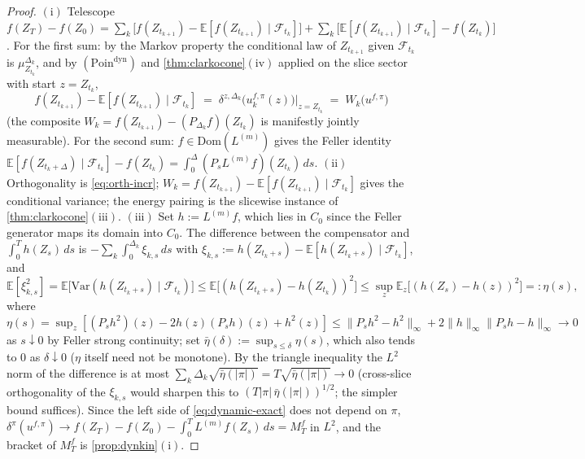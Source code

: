 \documentclass[reqno,final,11pt]{amsart}
\theoremstyle{plain}
\theoremstyle{definition}
\theoremstyle{remark}
\newcommand{\E}{\mathbb E}
\newcommand{\Dom}{\mathrm{Dom}}
\newcommand{\cF}{\mathcal F}
\begin{document}
\begin{proof}
$(\mathrm i)$ Telescope $f(Z_T)-f(Z_0)=\sum_k\bigl[f(Z_{t_{k+1}})-
\E[f(Z_{t_{k+1}})\mid\cF_{t_k}]\bigr]+\sum_k\bigl[\E[f(Z_{t_{k+1}})\mid\cF_{t_k}]
-f(Z_{t_k})\bigr]$. For the first sum: by the Markov property the conditional
law of $Z_{t_{k+1}}$ given $\cF_{t_k}$ is $\mu^{\Delta_k}_{Z_{t_k}}$, and by
$(\mathrm{Poin}^{\mathrm{dyn}})$ and \cref{thm:clarkocone}$(\mathrm{iv})$
applied on the slice sector with start $z=Z_{t_k}$,
\[
  f(Z_{t_{k+1}})-\E[f(Z_{t_{k+1}})\mid\cF_{t_k}]
  \;=\;\delta^{z,\Delta_k}\bigl(u^{f,\pi}_k(z)\bigr)\Big|_{z=Z_{t_k}}
  \;=\;W_k\bigl(u^{f,\pi}\bigr)
\]
(the composite $W_k=f(Z_{t_{k+1}})-(P_{\Delta_k}f)(Z_{t_k})$ is manifestly
jointly measurable). For the second sum: $f\in\Dom(L^{(m)})$ gives the Feller
identity $\E[f(Z_{t_k+\Delta})\mid\cF_{t_k}]-f(Z_{t_k})
=\int_0^{\Delta}(P_sL^{(m)}f)(Z_{t_k})\,ds$.
$(\mathrm{ii})$ Orthogonality is \eqref{eq:orth-incr};
$W_k=f(Z_{t_{k+1}})-\E[f(Z_{t_{k+1}})\mid\cF_{t_k}]$ gives the conditional
variance; the energy pairing is the slicewise instance of
\cref{thm:clarkocone}$(\mathrm{iii})$.
$(\mathrm{iii})$ Set $h:=L^{(m)}f$, which lies in $C_0$ since the Feller
generator maps its domain into $C_0$. The difference between the
compensator and $\int_0^Th(Z_s)\,ds$ is
$-\sum_k\int_0^{\Delta_k}\xi_{k,s}\,ds$ with
$\xi_{k,s}:=h(Z_{t_k+s})-\E[h(Z_{t_k+s})\mid\cF_{t_k}]$, and
\[
  \E[\xi_{k,s}^2]=\E\bigl[\mathrm{Var}(h(Z_{t_k+s})\mid\cF_{t_k})\bigr]
  \le\E\bigl[(h(Z_{t_k+s})-h(Z_{t_k}))^2\bigr]
  \le\sup_z\E_z\bigl[(h(Z_s)-h(z))^2\bigr]=:\eta(s),
\]
where $\eta(s)=\sup_z[(P_sh^2)(z)-2h(z)(P_sh)(z)+h^2(z)]
\le\|P_sh^2-h^2\|_\infty+2\|h\|_\infty\|P_sh-h\|_\infty\to0$ as $s\downarrow0$
by Feller strong continuity; set
$\bar\eta(\delta):=\sup_{s\le\delta}\eta(s)$, which also tends to $0$ as
$\delta\downarrow0$ ($\eta$ itself need not be monotone). By the triangle
inequality the $L^2$ norm of the
difference is at most $\sum_k\Delta_k\sqrt{\bar\eta(|\pi|)}=T\sqrt{\bar\eta(|\pi|)}\to0$
(cross-slice orthogonality of the $\xi_{k,s}$ would sharpen this to
$(T|\pi|\,\bar\eta(|\pi|))^{1/2}$; the simpler bound suffices).
Since the left side of \eqref{eq:dynamic-exact} does not depend on $\pi$,
$\delta^{\pi}(u^{f,\pi})\to f(Z_T)-f(Z_0)-\int_0^TL^{(m)}f(Z_s)\,ds=M^f_T$ in
$L^2$, and the bracket of $M^f_T$ is \cref{prop:dynkin}$(\mathrm i)$.
\end{proof}
\end{document}
